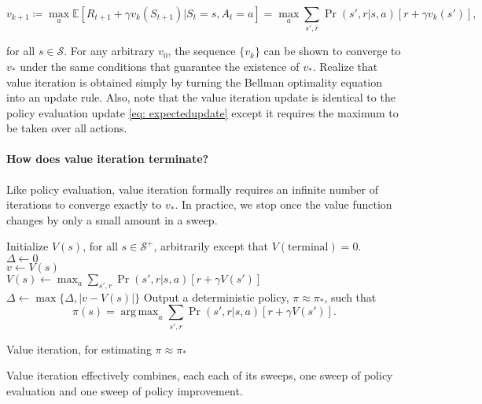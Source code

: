 \documentclass[12pt]{article}
\DeclareMathOperator*{\argmax}{arg\,max}
\begin{document}
\begin{equation}
  v_{k+1} \coloneqq \max_a \mathbb E \left[ R_{t+1} + \gamma v_k(S_{t+1}) | S_t = s , A_t = a \right] = \max_a \sum_{s',r} \Pr(s',r|s,a) \left[ r + \gamma v_k(s')\right],
\end{equation}

for all $s \in \mathcal S$. For any arbitrary $v_0$, the sequence $\{v_k\}$ can be shown to converge to $v_*$ under the same conditions that guarantee the existence of $v_*$. Realize that value iteration is obtained simply by turning the Bellman optimality equation into an update rule. Also, note that the value iteration update is identical to the policy evaluation update \ref{eq:     expectedupdate} except it requires the maximum to be taken over all actions.

\paragraph{How does value iteration terminate?} Like policy evaluation, value iteration formally requires an infinite number of iterations to converge exactly to $v_*$. In practice, we stop once the value function changes by only a small amount in a sweep.
\begin{algorithm}
  Initialize $V(s)$, for all $s \in \mathcal S^+$, arbitrarily except that   $V(\textrm{terminal}) = 0$. \\
\Do{$\Delta < \theta$} {
  $\Delta \gets 0$ \\
   {
    $v \gets V(s)$ \\
    $V(s) \gets \max_a \sum_{s',r} \Pr(s',r|s,a)\left[r+\gamma V(s')\right]$ \\
    $\Delta \gets \max\{\Delta, |v-V(s)|\}$
  }
}
Output a deterministic policy, $\pi \approx \pi_*$, such that
\[
  \pi(s) = \argmax_a \sum_{s',r} \Pr(s',r|s,a) \left[ r + \gamma V(s')\right].
\]
\caption{Value iteration, for estimating $\pi \approx \pi_*$}
\end{algorithm}
Value iteration effectively combines, each each of its sweeps, one sweep of policy evaluation and one sweep of policy improvement.
\end{document}
